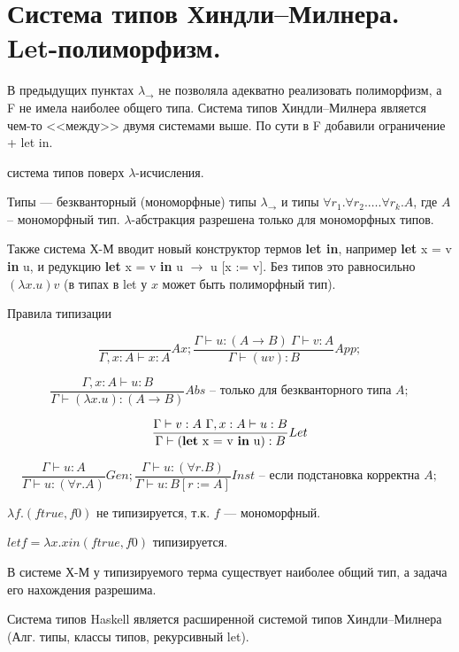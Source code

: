 \section{Система типов Хиндли–Милнера. Let-полиморфизм.}


В предыдущих пунктах $\lambda_{\to}$ не позволяла адекватно реализовать полиморфизм, а F не имела наиболее общего типа.
Система типов Хиндли–Милнера является чем-то <<между>> двумя системами выше.
По сути в F добавили ограничение + let in.

\begin{definition}
система типов поверх $\lambda$-исчисления.

Типы --- безкванторный (мономорфные) типы $\lambda_{\to}$ и типы $\forall r_1. \forall r_2. \ldots .\forall r_k .A$, где $A$ -- мономорфный тип.
$\lambda$-абстракция разрешена только для мономорфных типов.
\end{definition}

Также система Х-М вводит новый конструктор термов \textbf{let in}, например \textbf{let} x = v \textbf{in} u, и редукцию \textbf{let} x = v \textbf{in} u $\to$ u [x := v].
Без типов это равносильно $(\lambda x.u)v$ (в типах в let у $x$ может быть полиморфный тип).


Правила типизации

\[
\frac{}{\Gamma, x:A \vdash x:A} Ax;
\frac{\Gamma \vdash u : (A \to B)~\Gamma \vdash v : A}{\Gamma \vdash (uv):B} App;
\]

\[
\frac{\Gamma, x:A \vdash u:B}{\Gamma \vdash (\lambda x.u) : (A \to B)} Abs \text{ -- только для безкванторного типа } A;
\]

\[
\frac{\Gamma \vdash v : A ~ \Gamma, x : A \vdash u : B}{\Gamma \vdash (\text{\textbf{let} x = v \textbf{in} u}) : B} Let
\]

\[
\frac{\Gamma \vdash u : A}{\Gamma \vdash u : (\forall r.A)} Gen;
\frac{\Gamma \vdash u : (\forall r.B)}{\Gamma \vdash u : B[r := A]} Inst \text{ -- если подстановка корректна } A;
\]


\begin{example}
$\lambda f. (f true, f 0)$ не типизируется, т.к. $f$ --- мономорфный.

$let f = \lambda x. x in (f true, f 0)$ типизируется.

\end{example}

\begin{important}
В системе Х-М у типизируемого терма существует наиболее общий тип, а задача его нахождения разрешима.
\end{important}

\begin{important}
Система типов Haskell является расширенной системой типов Хиндли–Милнера (Алг. типы, классы типов, рекурсивный let).
\end{important}
